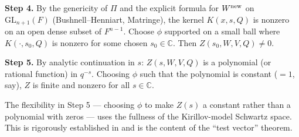 \textbf{Step 4.}  By the genericity of $\Pi$ and the explicit formula for $W^{\rm new}$ on $\mathrm{GL}_{n+1}(F)$ (Bushnell--Henniart, Matringe), the kernel $K(x,s,Q)$ is nonzero on an open dense subset of $F^{n-1}$.  Choose $\phi$ supported on a small ball where $K(\cdot, s_0, Q)$ is nonzero for some chosen $s_0\in\mathbb C$.  Then $Z(s_0,W,V,Q)\ne 0$.

\textbf{Step 5.}  By analytic continuation in $s$: $Z(s,W,V,Q)$ is a polynomial (or rational function) in $q^{-s}$.  Choosing $\phi$ such that the polynomial is constant ($=1$, say), $Z$ is finite and nonzero for all $s\in\mathbb C$.

\medskip
The flexibility in Step 5 — choosing $\phi$ to make $Z(s)$ a constant rather than a polynomial with zeros — uses the fullness of the Kirillov-model Schwartz space.  This is rigorously established in \cite{JPSS81} and is the content of the ``test vector'' theorem.


